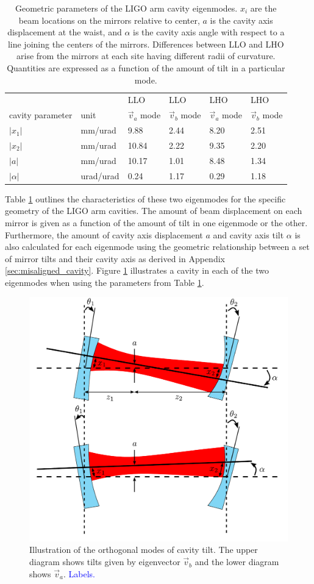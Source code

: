 \begin{table}
\centering
\caption{Geometric parameters of the LIGO arm cavity
  eigenmodes. $x_i$ are the beam locations on the mirrors relative
  to center, $a$ is the cavity axis displacement at the waist, and
  $\alpha$ is the cavity axis angle with respect to a line joining the
  centers of the mirrors. Differences between LLO and LHO arise from the
  mirrors at each site having different radii of curvature. Quantities
  are expressed as a function of the amount of tilt in a particular mode.}
\begin{tabular}{l l l l l l}
& & LLO & LLO & LHO & LHO \\
cavity parameter & unit & $\vec{v}_a$ mode & $\vec{v}_b$ mode & $\vec{v}_a$ mode & $\vec{v}_b$ mode \\
\hline\hline
$|x_1|$ & mm/urad & 9.88 & 2.44 & 8.20 & 2.51\\
$|x_2|$ & mm/urad & 10.84 & 2.22 & 9.35 & 2.20\\
$|a|$ & mm/urad & 10.17 & 1.01 & 8.48 & 1.34 \\
$|\alpha|$ & urad/urad & 0.24 & 1.17 & 0.29 & 1.18 \\
\hline
\end{tabular}
\label{table:cav_geometric}
\end{table}


Table \ref{table:cav_geometric} outlines the characteristics of these
two eigenmodes for the specific geometry of the LIGO arm cavities. The
amount of beam displacement on each mirror is given as a function of
the amount of tilt in one eigenmode or the other. Furthermore, the
amount of cavity axis displacement $a$ and cavity axis tilt $\alpha$
is also calculated for each eigenmode using the geometric relationship
between a set of mirror tilts and their cavity axis as derived in
Appendix \ref{sec:misaligned_cavity}. Figure \ref{fig:ss} illustrates
a cavity in each of the two eigenmodes when using the parameters from
Table \ref{table:cav_geometric}.


\begin{figure}
\begin{centering}
\includegraphics[width=0.6\columnwidth]{figures/eigenmodes.pdf}
\caption{Illustration of the orthogonal modes of cavity tilt. The
  upper diagram shows tilts given by eigenvector $\vec{v}_b$ and the
  lower diagram shows $\vec{v}_a$. \textcolor{blue}{Labels.}}
\label{fig:ss}
\end{centering}
\end{figure}




